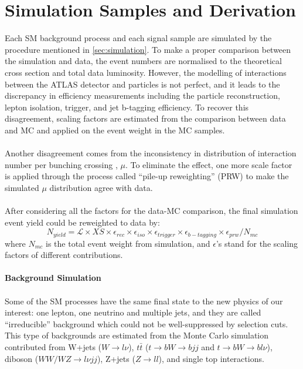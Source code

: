 \section{Simulation Samples and Derivation}
Each SM background process and each signal sample are simulated by the procedure mentioned in \ref{sec:simulation}.  To make a proper comparison between the simulation and data, the event numbers are normalised to the theoretical cross section and total data luminosity. However, the modelling of interactions between the ATLAS detector and particles is not perfect, and it leads to the discrepancy in efficiency measurements including the particle reconstruction, lepton isolation, trigger, and jet b-tagging efficiency. To recover this disagreement, scaling factors are estimated from the comparison between data and MC and applied on the event weight in the MC samples. 
\\
\\Another disagreement comes from the inconsistency in distribution of interaction number per bunching crossing , $\mu$. To eliminate the effect, one more scale factor is applied through the process called ``pile-up reweighting'' (PRW) to make the simulated $\mu$ distribution agree with data. 
\\
\\After considering all the factors for the data-MC comparison, the final simulation event yield could be reweighted to data by:
\begin{equation}
N_{yield} = \mathcal{L}\times XS \times \epsilon_{rec} \times \epsilon_{iso} \times \epsilon_{trigger} \times \epsilon_{b-tagging} \times \epsilon_{prw} / N_{mc}
\end{equation}
where $N_{mc}$ is the total event weight from simulation, and $\epsilon$'s stand for the scaling factors of different contributions. 
\\
\\{\bf Background Simulation}
\\
\\Some of the SM processes have the same final state to the new physics of our interest: one lepton, one neutrino and multiple jets, and they are called ``irreducible'' background which could not be well-suppressed by selection cuts. This type of backgrounds are estimated from the Monte Carlo simulation contributed from W+jets ($W\rightarrow l\nu$), $t\bar{t}$ ($t\rightarrow bW \rightarrow bjj$ and $t\rightarrow bW \rightarrow bl\nu$), diboson ($WW/WZ\rightarrow l\nu jj$), Z+jets ($Z\rightarrow ll$), and single top interactions.  
